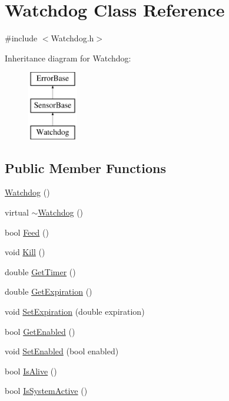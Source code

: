 \hypertarget{classWatchdog}{\section{\-Watchdog \-Class \-Reference}
\label{classWatchdog}
}


{\ttfamily \#include $<$\-Watchdog.\-h$>$}

\-Inheritance diagram for \-Watchdog\-:\begin{figure}[H]
\begin{center}
\leavevmode
\includegraphics[height=3.000000cm]{classWatchdog}
\end{center}
\end{figure}
\subsection*{\-Public \-Member \-Functions}
\begin{DoxyCompactItemize}
\item 
\hyperlink{classWatchdog_ab4aa2c62f897880ca29fd64062ab0e04}{\-Watchdog} ()
\item 
virtual \hyperlink{classWatchdog_ad836a36b5eb5dbe134d4050d49a95d4e}{$\sim$\-Watchdog} ()
\item 
bool \hyperlink{classWatchdog_a3cc002218451cef522323e31a47942fc}{\-Feed} ()
\item 
void \hyperlink{classWatchdog_a745909868621524196285fbafd19957a}{\-Kill} ()
\item 
double \hyperlink{classWatchdog_a1e9c281b0493b204846637c28a91ff2d}{\-Get\-Timer} ()
\item 
double \hyperlink{classWatchdog_a9bdab36844738068fab551d00f61825a}{\-Get\-Expiration} ()
\item 
void \hyperlink{classWatchdog_a9c38cdfcd21f1b66e4f19793c3116f63}{\-Set\-Expiration} (double expiration)
\item 
bool \hyperlink{classWatchdog_a3e909838aafb749f637323f06afc628c}{\-Get\-Enabled} ()
\item 
void \hyperlink{classWatchdog_a7b7f75dc69e94b17f62e57b915f3871a}{\-Set\-Enabled} (bool enabled)
\item 
bool \hyperlink{classWatchdog_aa985d8ec5ea4d0ab87d61180f74531d4}{\-Is\-Alive} ()
\item 
bool \hyperlink{classWatchdog_a5954d95dd512c007945c4d9061ef70ae}{\-Is\-System\-Active} ()
\end{DoxyCompactItemize}
